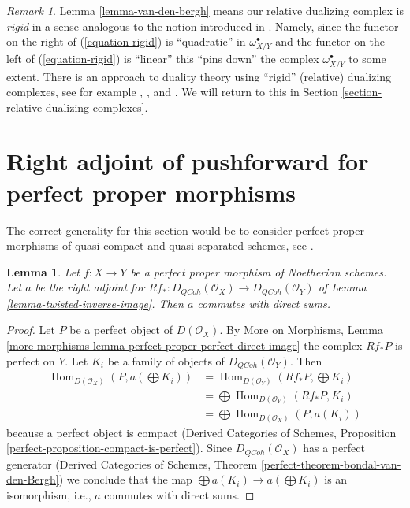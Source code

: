 \documentclass{stacks-project}
\theoremstyle{plain}
\newtheorem{lemma}[subsection]{Lemma}
\theoremstyle{definition}
\theoremstyle{remark}
\newtheorem{remark}[subsection]{Remark}
\numberwithin{equation}{subsection}
\def\Hom{\mathop{\mathrm{Hom}}\nolimits}
\def\QCoh{\mathit{QCoh}}
\begin{document}
\begin{remark}
\label{remark-van-den-bergh}
Lemma \ref{lemma-van-den-bergh} means our relative dualizing
complex is {\it rigid} in a sense analogous to the notion introduced
in \cite{vdB-rigid}. Namely, since the functor on the right of
(\ref{equation-rigid})
is ``quadratic'' in $\omega_{X/Y}^\bullet$ and the functor on the left
of (\ref{equation-rigid})
is ``linear'' this ``pins down'' the complex $\omega_{X/Y}^\bullet$
to some extent. There is an approach to duality theory using
``rigid'' (relative) dualizing complexes, see for example
\cite{Neeman-rigid}, \cite{Yekutieli-rigid}, and \cite{Yekutieli-Zhang}.
We will return to this in Section \ref{section-relative-dualizing-complexes}.
\end{remark}





\section{Right adjoint of pushforward for perfect proper morphisms}
\label{section-perfect-proper}

\noindent
The correct generality for this section would be to consider
perfect proper morphisms of quasi-compact and quasi-separated
schemes, see \cite{LN}.

\begin{lemma}
\label{lemma-proper-flat-noetherian}
Let $f : X \to Y$ be a perfect proper morphism of Noetherian schemes.
Let $a$ be the right adjoint for
$Rf_* : D_\QCoh(\mathcal{O}_X) \to D_\QCoh(\mathcal{O}_Y)$ of
Lemma \ref{lemma-twisted-inverse-image}. Then $a$ commutes with direct sums.
\end{lemma}

\begin{proof}
Let $P$ be a perfect object of $D(\mathcal{O}_X)$. By
More on Morphisms, Lemma
\ref{more-morphisms-lemma-perfect-proper-perfect-direct-image}
the complex $Rf_*P$ is perfect on $Y$.
Let $K_i$ be a family of objects of $D_\QCoh(\mathcal{O}_Y)$.
Then
\begin{align*}
\Hom_{D(\mathcal{O}_X)}(P, a(\bigoplus K_i))
& =
\Hom_{D(\mathcal{O}_Y)}(Rf_*P, \bigoplus K_i) \\
& =
\bigoplus \Hom_{D(\mathcal{O}_Y)}(Rf_*P, K_i) \\
& =
\bigoplus \Hom_{D(\mathcal{O}_X)}(P, a(K_i))
\end{align*}
because a perfect object is compact (Derived Categories of Schemes,
Proposition \ref{perfect-proposition-compact-is-perfect}).
Since $D_\QCoh(\mathcal{O}_X)$ has a perfect generator
(Derived Categories of Schemes, Theorem
\ref{perfect-theorem-bondal-van-den-Bergh})
we conclude that the map $\bigoplus a(K_i) \to a(\bigoplus K_i)$
is an isomorphism, i.e., $a$ commutes with direct sums.
\end{proof}
\end{document}
